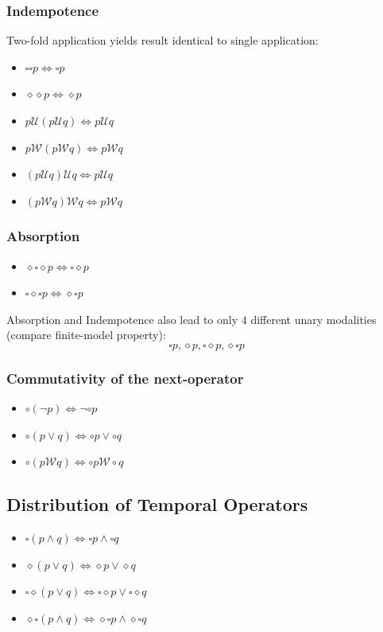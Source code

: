 \documentclass[a4paper, 10pt]{article}
\begin{document}
\begin{multicols}{2}
\subsubsection*{Indempotence}
Two-fold application yields result identical to single application:
\begin{itemize}
    \item $\square\square p \Leftrightarrow\square p$
    \item $\diamond\diamond p\Leftrightarrow\diamond p$
    \item $p \mathcal{U}(p \mathcal{U}q) \Leftrightarrow p \mathcal{U}q$
    \item $p \mathcal{W}(p \mathcal{W}q) \Leftrightarrow p \mathcal{W}q$
    \item $(p \mathcal{U}q)\mathcal{U}q \Leftrightarrow p \mathcal{U}q$
    \item $(p \mathcal{W}q)\mathcal{W}q \Leftrightarrow p \mathcal{W}q$
\end{itemize}
\subsubsection*{Absorption}
\begin{itemize}
    \item $\diamond\square\diamond p\Leftrightarrow \square\diamond p$
    \item $\square\diamond\square p\Leftrightarrow \diamond\square p$
\end{itemize}
Absorption and Indempotence also lead to only $4$ different unary modalities (compare finite-model property):
\[ \square p,\diamond p,\square\diamond p,\diamond\square p \]
\subsubsection{Commutativity of the next-operator}%
\begin{itemize}
    \item $\circ(\neg p)\Leftrightarrow\neg\circ p$
    \item $\circ(p\vee q)\Leftrightarrow\circ p\vee\circ q$
    \item $\circ(p \mathcal{W}q)\Leftrightarrow\circ p \mathcal{W}\circ q$
\end{itemize}
\subsection*{Distribution of Temporal Operators}
\begin{itemize}
    \item $\square(p\wedge q)\Leftrightarrow\square p\wedge\square q$
    \item $\diamond(p\vee q)\Leftrightarrow\diamond p\vee \diamond q$
    \item $\square\diamond(p\vee q)\Leftrightarrow\square\diamond p\vee\square\diamond q$
    \item $\diamond\square(p\wedge q)\Leftrightarrow\diamond\square p\wedge\diamond\square q$
\end{itemize}

\end{multicols}
\end{document}
